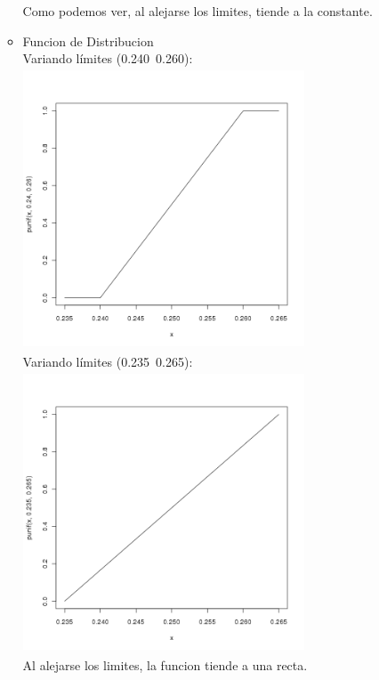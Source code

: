 \begin{itemize}
\begin{itemize}
		Como podemos ver, al alejarse los limites, tiende a la constante.\\
		\item Funcion de Distribucion\\
                        Variando l\'imites (0.240~0.260):\\
                \includegraphics[width=3.3in,height=3.3in]{images/2_1-punif-variado1.png}\\
                        Variando l\'imites (0.235~0.265):\\
                \includegraphics[width=3.3in,height=3.3in]{images/2_1-punif-variado2.png}\\
		Al alejarse los limites, la funcion tiende a una recta.\\

	\end{itemize}

\end{itemize}
